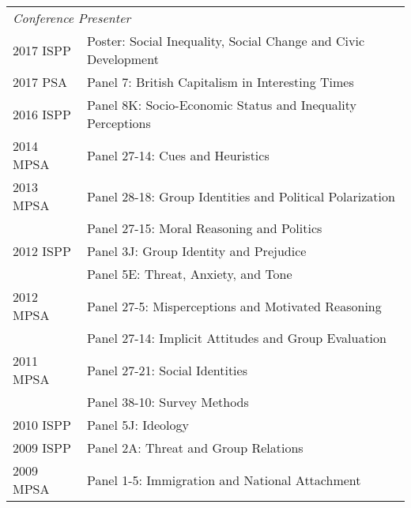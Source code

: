 \documentclass[12pt]{article}
\begin{document}
\begin{longtable}{@{}p{3.5cm}@{}l}%
    \multicolumn{2}{l}{\textit{Conference Presenter}}\\   
            2017 ISPP & {Poster: Social Inequality, Social Change and Civic Development}\\       
    
			2017 PSA & {Panel 7: British Capitalism in Interesting Times}\\            
            
            2016 ISPP & {Panel 8K: Socio-Economic Status and Inequality Perceptions}\\           
            
            2014 MPSA & {Panel 27-14: Cues and 
            Heuristics}\\            
            
            2013 MPSA & {Panel 28-18: Group Identities 
            and Political Polarization}\\
            
            & {Panel 27-15: Moral Reasoning and Politics}\\
            
            2012 ISPP & {Panel 3J: Group Identity and Prejudice}\\
            
            & {Panel 5E: Threat, Anxiety, and Tone}\\
            
            2012 MPSA & {Panel 27-5: Misperceptions 
            and Motivated Reasoning}\\
            
            & {Panel 27-14: Implicit Attitudes and Group Evaluation}\\
            
            2011 MPSA & {Panel 27-21: Social Identities}\\
            
            & {Panel 38-10: Survey Methods}\\
            
            2010 ISPP & {Panel 5J: Ideology}\\
            
            2009 ISPP & {Panel 2A: Threat and Group Relations}\\
            
            2009 MPSA & {Panel 1-5: Immigration and National Attachment}\\
            

\end{longtable}
\end{document}
